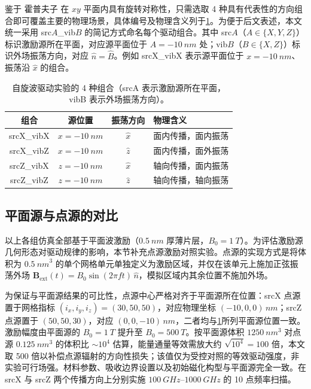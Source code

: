 鉴于 霍普夫子 在 $xy$ 平面内具有旋转对称性，只需选取 4 种具有代表性的方向组合即可覆盖主要的物理场景，具体编号及物理含义列于\cref{tab:sw-combos}。为便于后文表述，本文统一采用 src$A$\_vib$B$ 的简记方式命名每个驱动组合。其中 src$A$（$A \in \{X, Y, Z\}$）标识激励源所在平面，对应源平面位于 $A = -\SI{10}{nm}$ 处；vib$B$（$B \in \{X, Z\}$）标识外场振荡方向，对应 $\hat{n} = \hat{B}$。例如 srcX\_vibX 表示源平面位于 $x = -\SI{10}{nm}$、振荡沿 $\hat{x}$ 的组合。

\begin{table}[htbp]
  \centering
  \caption{自旋波驱动实验的 4 种组合（srcA 表示激励源所在平面，vibB 表示外场振荡方向）。}
  \label{tab:sw-combos}
  \begin{tabular}{cccl}
    \toprule
    组合 & 源位置 & 振荡方向 & 物理含义 \\
    \midrule
    srcX\_vibX & $x = -\SI{10}{nm}$ & $\hat{x}$ & 面内传播，面内振荡 \\
    srcX\_vibZ & $x = -\SI{10}{nm}$ & $\hat{z}$ & 面内传播，面外振荡 \\
    srcZ\_vibX & $z = -\SI{10}{nm}$ & $\hat{x}$ & 轴向传播，面内振荡 \\
    srcZ\_vibZ & $z = -\SI{10}{nm}$ & $\hat{z}$ & 轴向传播，轴向振荡 \\
    \bottomrule
  \end{tabular}
\end{table}

\subsection{平面源与点源的对比}
以上各组仿真全部基于平面波激励（$\SI{0.5}{nm}$ 厚薄片层，$B_0 = \SI{1}{T}$）。为评估激励源几何形态对驱动规律的影响，本节补充点源激励对照实验。点源的实现方式是将体积为 $\SI{0.5}{nm}^3$ 的单个网格单元单独定义为激励区域，并仅在该单元上施加正弦振荡外场 $\mathbf{B}_{\text{ext}}(t) = B_0 \sin(2\pi f t)\, \hat{n}$，模拟区域内其余位置不施加外场。

为保证与平面源结果的可比性，点源中心严格对齐于平面源所在位置：srcX 点源置于网格指标 $(i_x, i_y, i_z) = (30, 50, 50)$，对应物理坐标 $(-10, 0, 0)\,\si{nm}$；srcZ 点源置于 $(50, 50, 30)$，对应 $(0, 0, -10)\,\si{nm}$，二者均与\cref{tab:sw-combos}所列平面源位置一致。激励幅度由平面源的 $B_0 = \SI{1}{T}$ 提升至 $B_0 = \SI{500}{T}$。按平面源体积 $\SI{1250}{nm^3}$ 对点源 $\SI{0.125}{nm^3}$ 的体积比 $\sim 10^4$ 估算，能量通量等效需放大约 $\sqrt{10^4} = 100$ 倍，本文取 500 倍以补偿点源辐射的方向性损失；该值仅为受控对照的等效驱动强度，非实验可行场强。材料参数、吸收边界设置以及初始磁化构型与平面源完全一致。在 srcX 与 srcZ 两个传播方向上分别实施 $\SIrange{100}{1000}{GHz}$ 的 10 点频率扫描。

